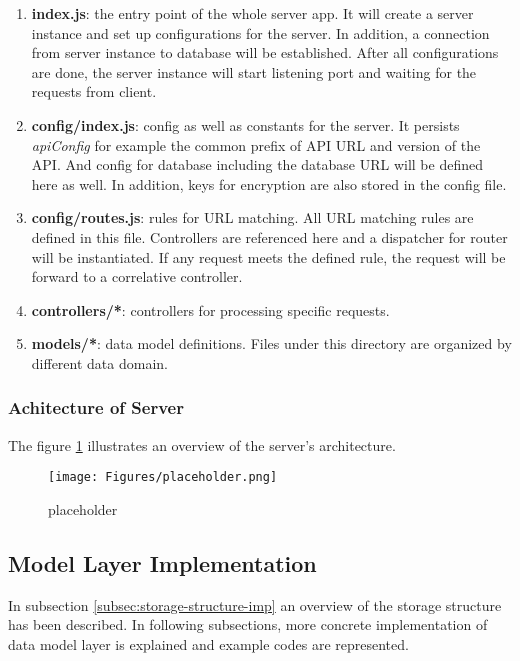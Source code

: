 \begin{enumerate}
\item 
  \textbf{index.js}: the entry point of the whole server app. It will create a server instance and set up configurations for the server. In addition, a connection from server instance to database will be established. After all configurations are done, the server instance will start listening port and waiting for the requests from client.
\item
  \textbf{config/index.js}: config as well as constants for the server. It persists \textit{apiConfig} for example the common prefix of API URL and version of the API. And config for database including the database URL will be defined here as well. In addition, keys for encryption are also stored in the config file.
\item
  \textbf{config/routes.js}: rules for URL matching. All URL matching rules are defined in this file. Controllers are referenced here and a dispatcher for router will be instantiated. If any request meets the defined rule, the request will be forward to a correlative controller. 
\item
  \textbf{controllers/*}: controllers for processing specific requests.
\item 
  \textbf{models/*}: data model definitions. Files under this directory are organized by different data domain.
\end{enumerate}


\subsubsection{Achitecture of Server}

The figure \ref{fig:server-arch-imp} illustrates an overview of the server's architecture. 

\begin{figure}[!htbp]
  \centering
    \texttt{[image: Figures/placeholder.png]}
  \caption{placeholder}
  \label{fig:server-arch-imp}
\end{figure}




\subsection{Model Layer Implementation}
In subsection \ref{subsec:storage-structure-imp} an overview of the storage structure has been described. In following subsections, more concrete implementation of data model layer is explained and example codes are represented.

